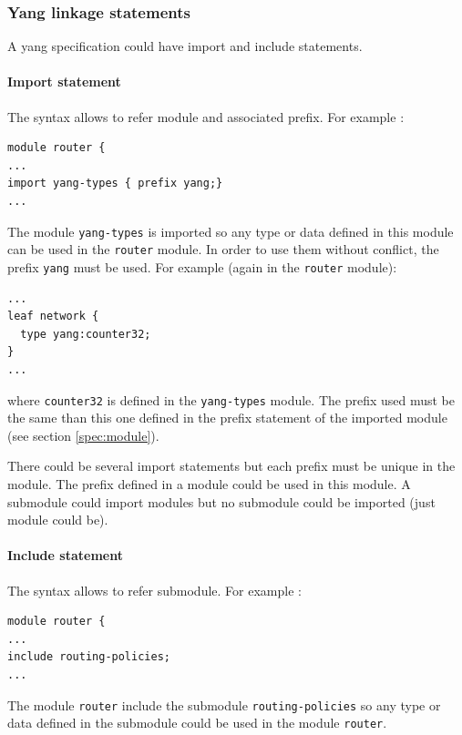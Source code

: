\documentclass[a4paper]{article}
\begin{document}
\subsubsection{Yang linkage statements}

A  yang specification  could  have import  and  include statements.  

\paragraph{Import statement}

The  syntax  allows  to  refer     module  and    associated
prefix. For example :

\begin{verbatim}
module router {
...
import yang-types { prefix yang;}
...
\end{verbatim}

The module {\tt yang-types} is imported  so any type or data defined in
this module  can be used in the  {\tt router} module. In  order to use
them without conflict, the prefix {\tt yang} must be used. For example
(again in the  {\tt router} module):

\begin{verbatim}
...
leaf network {
  type yang:counter32;
}
...
\end{verbatim}

where {\tt counter32}  is defined in the {\tt  yang-types} module. The
prefix  used must  be the  same than  this one  defined in  the prefix
statement of the imported  module (see section \ref{spec:module}). 

 There  could be  several import  statements but  each prefix  must be
unique in the module.  The prefix defined in a module could be used in
this module. A  submodule could import modules but  no submodule could
be imported (just module could be).


\paragraph{Include statement}
\label{spec:include}

The syntax allows to refer submodule. For example :

\begin{verbatim}
module router {
...
include routing-policies;
...
\end{verbatim}

The module {\tt router} include the submodule {\tt routing-policies}
so any type or data defined in the submodule could be used in the
module {\tt router}.
\end{document}
